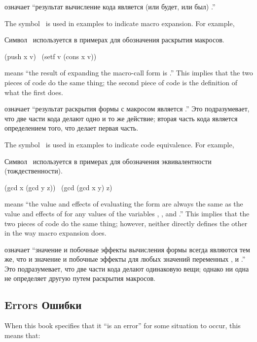 означает ``результат вычисление кода  является (или будет, или был) .''

The symbol \EX\ is used in examples to indicate macro expansion.
For example,

Символ \EX\ используется в примерах для обозначения раскрытия макросов.
\begin{lisp}
(push x v) \EX\ (setf v (cons x v))
\end{lisp}
means ``the result of expanding the macro-call form 
is .''  This implies that the two pieces
of code do the same thing; the second piece of code is
the definition of what the first does.

означает ``результат раскрытия формы с макросом 
является .'' Это подразумевает, что две части кода
делают одно и то же действие; вторая часть кода является определением того, что
делает первая часть.

The symbol \EQ\ is used in examples to indicate code equivalence.
For example,

Символ \EQ\ используется в примерах для обозначения эквивалентности (тождественности).
\begin{lisp}
(gcd x (gcd y z)) \EQ\ (gcd (gcd x y) z)
\end{lisp}
means ``the value and effects of evaluating the form
 are always the same as the value
and effects of
 for any values of the
variables , , and .''
This implies that the two pieces
of code do the same thing; however, neither directly defines
the other in the way macro expansion does.

означает ``значение и побочные эффекты вычисления формы  всегда
являются тем же, что и значение и побочные эффекты  для любых
значений переменных ,  и .''
Это подразумевает, что две части кода делают одинаковую вещи; однако ни одна не
определяет другую путем раскрытия макросов.

\subsection{Errors Ошибки}
\label{INTRO-ERRORS}

When this book specifies that it ``is an error'' for some situation
to occur, this means that:

